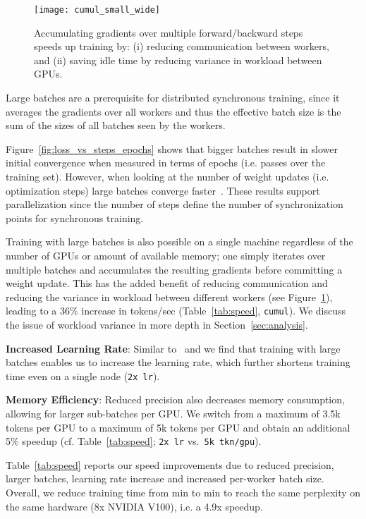 \documentclass[11pt,a4paper]{article}
\begin{document}
\begin{figure}
\begin{center}
\texttt{[image: cumul\_small\_wide]}
\end{center}
\caption{Accumulating gradients over multiple forward/backward steps speeds up training by: (i) reducing communication between workers, and (ii) saving idle time by reducing variance in workload between GPUs.}
\label{fig:cumul}
\end{figure}

Large batches are a prerequisite for distributed synchronous training, since it averages the gradients over all workers and thus the effective batch size is the sum of the sizes of all batches seen by the workers.

Figure~\ref{fig:loss_vs_steps_epochs} shows that bigger batches result in slower initial convergence when measured in terms of epochs (i.e. passes over the training set). However, when looking at the number of weight updates (i.e. optimization steps) large batches converge faster~\citep{hoffer2017train}. These results support parallelization since the number of steps define the number of synchronization points for synchronous training.

Training with large batches is also possible on a single machine regardless of the number of GPUs or amount of available memory; one simply iterates over multiple batches and accumulates the resulting gradients before committing a weight update.
This has the added benefit of reducing communication and reducing the variance in workload between different workers (see Figure~\ref{fig:cumul}), leading to a 36\% increase in tokens/sec (Table~\ref{tab:speed}, \texttt{cumul}).
We discuss the issue of workload variance in more depth in Section~\ref{sec:analysis}.

\textbf{Increased Learning Rate}: Similar to~\citet{goyal2017cvpr} and \citet{smith2017lrbsz} we find that training with large batches enables us to increase the learning rate, which further shortens training time even on a single node (\texttt{2x lr}).

\textbf{Memory Efficiency}: Reduced precision also decreases
memory consumption, allowing for larger sub-batches per GPU.
We switch from a maximum of 3.5k tokens per GPU to a maximum of 5k tokens per GPU and obtain an additional 5\% speedup (cf. Table~\ref{tab:speed}; \texttt{2x lr} vs.~\texttt{5k tkn/gpu}).

Table~\ref{tab:speed} reports our speed improvements due to reduced precision, larger batches, learning rate increase and increased per-worker batch size.
Overall, we reduce training time from  min to  min to reach the same perplexity on the same hardware (8x NVIDIA V100), i.e. a 4.9x speedup.
\end{document}
